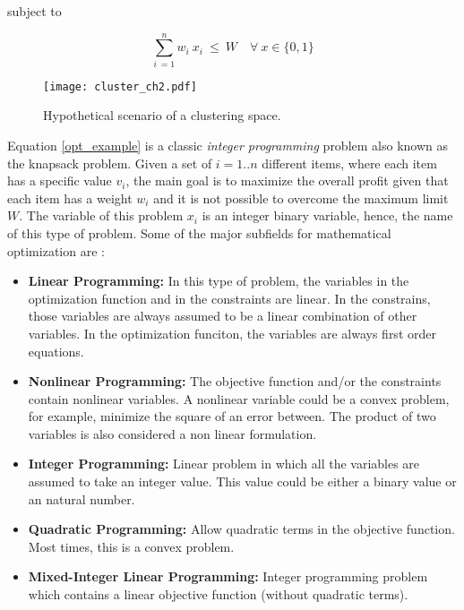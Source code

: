 subject to 

\begin{equation}
    \sum_{i\ = 1}^{n} w_i\ x_i \ \leq \ W \quad \forall \ x \in \{0,1\}
\end{equation}

\begin{figure}[htb]
    \centering
    \texttt{[image: cluster\_ch2.pdf]}
    \caption{Hypothetical scenario of a clustering space.}
    \label{cluster_ch2}
\end{figure}

Equation \eqref{opt_example} is a classic \textit{integer programming} problem also known as the knapsack problem. Given a set of $i = 1..n$ different items, where each item has a specific value $v_i$, the main goal is to maximize the overall profit given that each item has a weight $w_i$ and it is not possible to overcome the maximum limit $W$. The variable of this problem $x_i$ is an integer binary variable, hence, the name of this type of problem. Some of the major subfields for mathematical optimization are \cite{cplex, ampl}:
\begin{itemize}
    \item \textbf{Linear Programming:} In this type of problem, the variables in the optimization function and in the constraints are linear. In the constrains, those variables are always assumed to be a linear combination of other variables. In the optimization funciton, the variables are always first order equations.  
    \item \textbf{Nonlinear Programming:} The objective function and/or the constraints contain nonlinear variables. A nonlinear variable could be a convex problem, for example, minimize the square of an error between. The product of two variables is also considered a non linear formulation. 
    \item \textbf{Integer Programming:} Linear problem in which all the variables are assumed to take an integer value. This value could be either a binary value or an natural number. 
    \item \textbf{Quadratic Programming:} Allow quadratic terms in the objective function. Most times, this is a convex problem.
    \item \textbf{Mixed-Integer Linear Programming:} Integer programming problem which contains a linear objective function (without quadratic terms).
\end{itemize}


